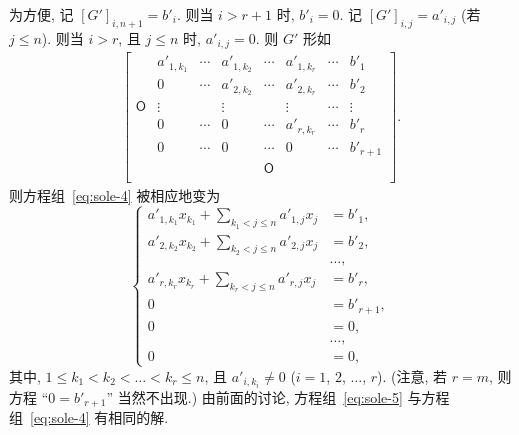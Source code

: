 \documentclass[../libro.tex]{subfiles}
\begin{document}
为方便, 记 \([G']_{i,n+1} = b'_i\).
则当 \(i > r + 1\) 时, \(b'_i = 0\).
记 \([G']_{i,j} = a'_{i,j}\)
(若 \(j \leq n\)).
则当 \(i > r\), 且 \(j \leq n\) 时,
\(a'_{i,j} = 0\).
则 \(G'\) 形如
\begin{align*}
    \begin{bmatrix}
        {}         & a'_{1,k_1} & \cdots & a'_{1,k_2} & \cdots     & a'_{1,k_r} & \cdots & b'_1     \\
        {}         & 0          & \cdots & a'_{2,k_2} & \cdots     & a'_{2,k_r} & \cdots & b'_2     \\
        \mathsf{O} & \vdots     & {}     & \vdots     & {}         & \vdots     & \cdots & \vdots   \\
        {}         & 0          & \cdots & 0          & \cdots     & a'_{r,k_r} & \cdots & b'_r     \\
        {}         & 0          & \cdots & 0          & \cdots     & 0          & \cdots & b'_{r+1} \\
        {}         & {}         & {}     & {}         & \mathsf{O} & {}         & {}     & {}       \\
    \end{bmatrix}.
\end{align*}
则方程组~\eqref{eq:sole-4} 被相应地变为
\begin{equation}
    \left\{ %
    \begin{aligned}
        a'_{1,k_1} x_{k_1} + \sum_{k_1 < j \leq n} {a'_{1,j} x_{j}} & = b'_1,     \\
        a'_{2,k_2} x_{k_2} + \sum_{k_2 < j \leq n} {a'_{2,j} x_{j}} & = b'_2,     \\
        & \dots, \\
        a'_{r,k_r} x_{k_r} + \sum_{k_r < j \leq n} {a'_{r,j} x_{j}} & = b'_r,     \\
        0                                                           & = b'_{r+1}, \\
        0                                                           & = 0,        \\
        & \dots, \\
        0                                                           & = 0,
    \end{aligned}
    \right. %
    \label{eq:sole-5}
\end{equation}
其中, \(1 \leq k_1 < k_2 < \dots < k_r \leq n\),
且 \(a'_{i,k_i} \neq 0\)
(\(i = 1\), \(2\), \(\dots\), \(r\)).
(注意, 若 \(r = m\),
则方程 ``\(0 = b'_{r+1}\)'' 当然不出现.)
由前面的讨论, 方程组~\eqref{eq:sole-5}
与方程组~\eqref{eq:sole-4} 有相同的解.
\end{document}

